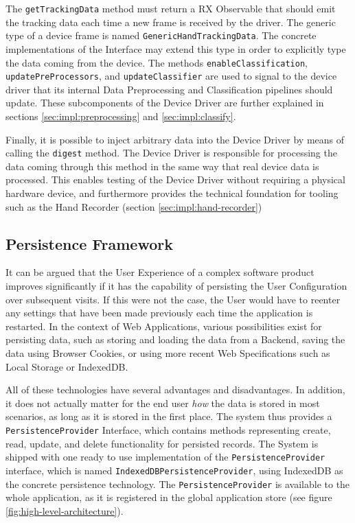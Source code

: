 The \texttt{getTrackingData} method must return a \gls{RX} Observable that should emit the tracking data each time a new frame is received by the driver. The generic type of a device frame is named \texttt{GenericHandTrackingData}. The concrete implementations of the Interface may extend this type in order to explicitly type the data coming from the device. The methods \texttt{enableClassification}, \texttt{updatePreProcessors}, and \texttt{updateClassifier} are used to signal to the device driver that its internal Data Preprocessing and Classification pipelines should update. These subcomponents of the Device Driver are further explained in sections \ref{sec:impl:preprocessing} and \ref{sec:impl:classify}.

Finally, it is possible to inject arbitrary data into the Device Driver by means of calling the \texttt{digest} method. The Device Driver is responsible for processing the data coming through this method in the same way that real device data is processed. This enables testing of the Device Driver without requiring a physical hardware device, and furthermore provides the technical foundation for tooling such as the Hand Recorder (section \ref{sec:impl:hand-recorder})

\subsection{Persistence Framework}
\label{sec:impl:persist}
It can be argued that the User Experience of a complex software product improves significantly if it has the capability of persisting the User Configuration over subsequent visits. If this were not the case, the User would have to reenter any settings that have been made previously each time the application is restarted. In the context of Web Applications, various possibilities exist for persisting data, such as storing and loading the data from a Backend, saving the data using Browser Cookies, or using more recent Web Specifications such as Local Storage or IndexedDB.

All of these technologies have several advantages and disadvantages. In addition, it does not actually matter for the end user \emph{how} the data is stored in most scenarios, as long as it is stored in the first place. The system thus provides a \texttt{PersistenceProvider} Interface, which contains methods representing create, read, update, and delete functionality for persisted records. The System is shipped with one ready to use implementation of the \texttt{PersistenceProvider} interface, which is named \texttt{IndexedDBPersistenceProvider}, using IndexedDB as the concrete persistence technology. The \texttt{PersistenceProvider} is available to the whole application, as it is registered in the global application store (see figure \ref{fig:high-level-architecture}).


